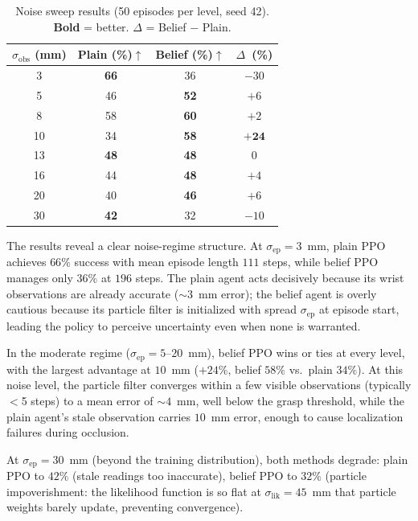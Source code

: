 \documentclass[conference]{IEEEtran}
\newcommand{\sigmaobs}{\sigma_{\text{obs}}}
\newcommand{\sigmaep}{\sigma_{\text{ep}}}
\begin{document}
\begin{table}[!t]
  \caption{Noise sweep results (50 episodes per level, seed 42).
           \textbf{Bold} = better. $\Delta$ = Belief $-$ Plain.}
  \label{tab:noise_sweep}
  \centering
  \begin{tabular}{c cc c}
    \toprule
    $\sigmaobs$ (mm) & Plain (\%)$\uparrow$ & Belief (\%)$\uparrow$ & $\Delta$~(\%) \\
    \midrule
    3  & \textbf{66} & 36 & $-30$ \\
    5  & 46 & \textbf{52} & $+6$ \\
    8  & 58 & \textbf{60} & $+2$ \\
    10 & 34 & \textbf{58} & $\mathbf{+24}$ \\
    13 & \textbf{48} & \textbf{48} & $0$ \\
    16 & 44 & \textbf{48} & $+4$ \\
    20 & 40 & \textbf{46} & $+6$ \\
    30 & \textbf{42} & 32 & $-10$ \\
    \bottomrule
  \end{tabular}
\end{table}

The results reveal a clear noise-regime structure.
At $\sigmaep = 3$~mm, plain PPO achieves $66\%$ success with mean episode
length $111$ steps, while belief PPO manages only $36\%$ at $196$ steps.
The plain agent acts decisively because its wrist observations are already
accurate ($\sim\!3$~mm error); the belief agent is overly cautious because
its particle filter is initialized with spread $\sigmaep$ at episode start,
leading the policy to perceive uncertainty even when none is warranted.

In the moderate regime ($\sigmaep = 5$--$20$~mm), belief PPO wins or ties at
every level, with the largest advantage at $10$~mm ($+24\%$, belief $58\%$
vs.\ plain $34\%$).
At this noise level, the particle filter converges within a few visible
observations (typically $<$5 steps) to a mean error of $\sim\!4$~mm,
well below the grasp threshold, while the plain agent's stale observation
carries $10$~mm error, enough to cause localization failures during occlusion.

At $\sigmaep = 30$~mm (beyond the training distribution), both methods
degrade: plain PPO to $42\%$ (stale readings too inaccurate), belief PPO
to $32\%$ (particle impoverishment: the likelihood function is so flat at
$\sigma_{\text{lik}} = 45$~mm that particle weights barely update,
preventing convergence).
\end{document}
